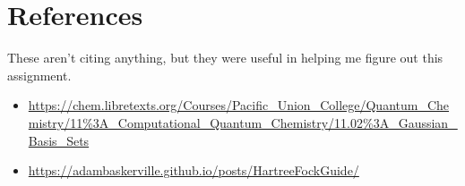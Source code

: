 \documentclass[10pt, oneside, letterpaper]{article}
\begin{document}
\newpage
\section{References}

These aren't citing anything, but they were useful in helping me figure out this assignment.

\begin{itemize}
  \item \url{https://chem.libretexts.org/Courses/Pacific_Union_College/Quantum_Chemistry/11%3A_Computational_Quantum_Chemistry/11.02%3A_Gaussian_Basis_Sets} %
  \item \url{https://adambaskerville.github.io/posts/HartreeFockGuide/}
\end{itemize}
\end{document}
